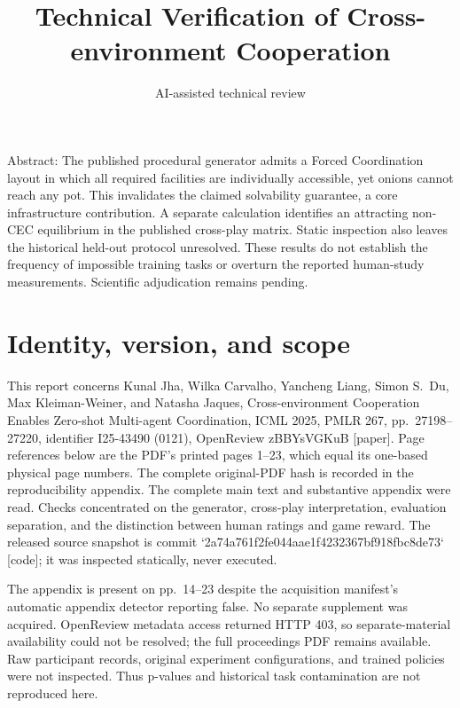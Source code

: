 \documentclass[10pt]{article}
\title{Technical Verification of
Cross-environment Cooperation}
\author{AI-assisted technical review}
\date{}
\begin{document}
\maketitle
Abstract: The published procedural generator admits a Forced Coordination layout in which all required facilities are individually accessible, yet onions cannot reach any pot. This invalidates the claimed solvability guarantee, a core infrastructure contribution. A separate calculation identifies an attracting non-CEC equilibrium in the published cross-play matrix. Static inspection also leaves the historical held-out protocol unresolved. These results do not establish the frequency of impossible training tasks or overturn the reported human-study measurements. Scientific adjudication remains pending.\par
\section*{Identity, version, and scope}
This report concerns Kunal Jha, Wilka Carvalho, Yancheng Liang, Simon S. Du, Max Kleiman-Weiner, and Natasha Jaques, Cross-environment Cooperation Enables Zero-shot Multi-agent Coordination, ICML 2025, PMLR 267, pp. 27198–27220, identifier I25-43490 (0121), OpenReview zBBYsVGKuB [paper]. Page references below are the PDF’s printed pages 1–23, which equal its one-based physical page numbers. The complete original-PDF hash is recorded in the reproducibility appendix. The complete main text and substantive appendix were read. Checks concentrated on the generator, cross-play interpretation, evaluation separation, and the distinction between human ratings and game reward. The released source snapshot is commit `2a74a761f2fe044aae1f4232367bf918fbc8de73` [code]; it was inspected statically, never executed.\par
The appendix is present on pp. 14–23 despite the acquisition manifest’s automatic appendix detector reporting false. No separate supplement was acquired. OpenReview metadata access returned HTTP 403, so separate-material availability could not be resolved; the full proceedings PDF remains available. Raw participant records, original experiment configurations, and trained policies were not inspected. Thus p-values and historical task contamination are not reproduced here.\par
\end{document}
